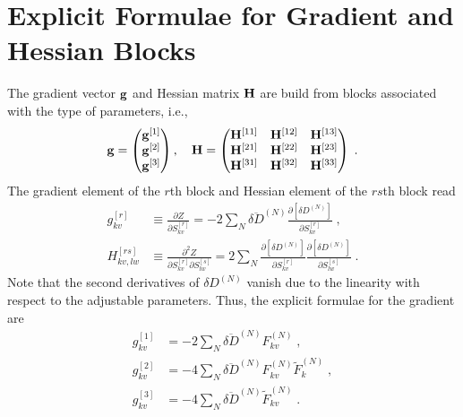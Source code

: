 \documentclass[aip,amsmath,amssymb,reprint]{revtex4-1}
\begin{document}
\section{\label{a:blocks} Explicit Formulae for Gradient and Hessian Blocks}

The gradient vector ${\bf g}$ and Hessian matrix ${\bf H}$ 
are build from blocks associated with the type of parameters, i.e.,
%
\begin{equation}\label{e:Newton.gH}
 {\bf g} = 
\begin{pmatrix}
{\bf g}^{[1]} \\ 
{\bf g}^{[2]} \\ 
{\bf g}^{[3]}
\end{pmatrix} ,\quad
 {\bf H} = 
\begin{pmatrix}
{\bf H}^{[11]} & {\bf H}^{[12]} & {\bf H}^{[13]} \\ 
{\bf H}^{[21]} & {\bf H}^{[22]} & {\bf H}^{[23]} \\ 
{\bf H}^{[31]} & {\bf H}^{[32]} & {\bf H}^{[33]} 
\end{pmatrix} \;.
\end{equation}
%
The gradient element of the $r$th block and Hessian element of the $rs$th block read
%
\begin{subequations}
 \begin{align}
  g^{[r ]}_{kv}    &\equiv \frac{\partial   Z}{\partial S_{kv}^{[r]}} 
     =-2\sum_N \overline{\delta D}^{(N)}
               \frac{\partial   \left[ \delta D^{(N)} \right]}{\partial S_{kv}^{[r]}} \;,\\
  H^{[rs]}_{kv,lw} &\equiv \frac{\partial^2 Z}{\partial S_{kv}^{[r]} \partial S_{lw}^{[s]}}  
     = 2\sum_N 
        \frac{\partial   \left[ \delta D^{(N)} \right]}{\partial S_{kv}^{[r]}}
        \frac{\partial   \left[ \delta D^{(N)} \right]}{\partial S_{lw}^{[s]}} \;.
 \end{align}
\end{subequations}
%
Note that the second derivatives of $\delta D^{(N)}$ vanish
due to the linearity with respect to the adjustable parameters.
Thus, the explicit formulae for the gradient are
%
\begin{subequations}
 \begin{align}
  g^{[1]}_{kv} &=-2\sum_N \overline{\delta D}^{(N)} F^{(N)}_{kv} \;,\\
  g^{[2]}_{kv} &=-4\sum_N \overline{\delta D}^{(N)} F^{(N)}_{kv} \widetilde{F}^{(N)}_k \;,\\
  g^{[3]}_{kv} &=-4\sum_N \overline{\delta D}^{(N)} \widetilde{F}^{(N)}_{kv} \;.
 \end{align}
\end{subequations}
\end{document}
